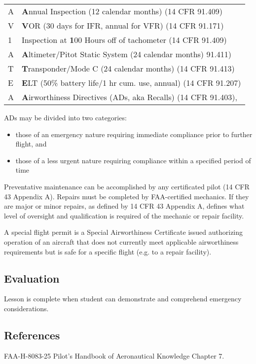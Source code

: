 \begin{table}[h]
\centering
\begin{tabular}{ll}
A & \textbf{A}nnual Inspection (12 calendar months) (14 CFR 91.409)        \\
V & \textbf{V}OR (30 days for IFR, annual for VFR) (14 CFR 91.171)         \\
1 & Inspection at \textbf{1}00 Hours off of tachometer (14 CFR 91.409)     \\
A & \textbf{A}ltimeter/Pitot Static System (24 calendar months) 91.411)    \\
T & \textbf{T}ransponder/Mode C (24 calendar months) (14 CFR 91.413)       \\
E & \textbf{E}LT (50\% battery life/1 hr cum. use, annual) (14 CFR 91.207) \\
A & \textbf{A}irworthiness Directives (ADs, aka Recalls) (14 CFR 91.403),
\end{tabular}
\end{table}

ADs may be divided into two categories:
\begin{itemize}
  \item those of an emergency nature requiring immediate compliance prior to
    further flight, and

  \item those of a less urgent nature requiring compliance within a specified
    period of time
\end{itemize}

Preventative maintenance can be accomplished by any certificated pilot (14 CFR
43 Appendix A). Repairs must be completed by FAA-certified mechanics. If they
are major or minor repairs, as defined by 14 CFR 43 Appendix A, defines what
level of oversight and qualification is required of the mechanic or repair
facility.

A special flight permit is a Special Airworthiness Certificate issued
authorizing operation of an aircraft that does not currently meet applicable
airworthiness requirements but is safe for a specific flight (e.g. to a repair
facility).

\subsection{Evaluation}

Lesson is complete when student can demonstrate and comprehend emergency
considerations.

\subsection{References}

FAA-H-8083-25 Pilot's Handbook of Aeronautical Knowledge Chapter 7.

